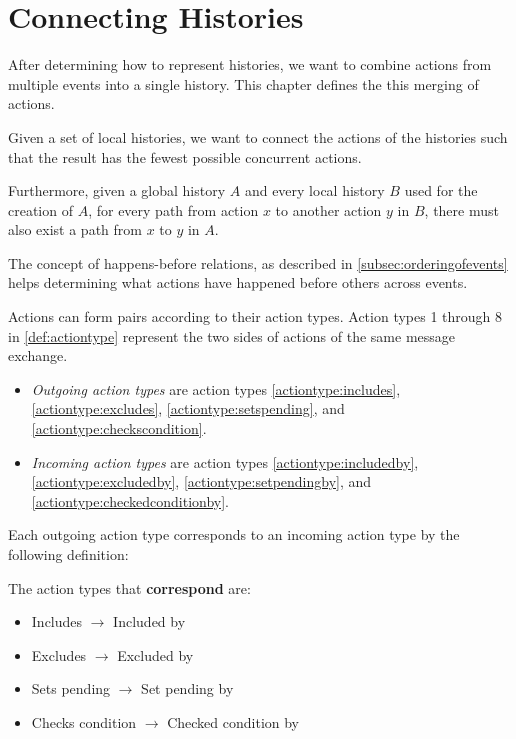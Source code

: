 \chapter{Connecting Histories} 
\label{chap:connecting-histories}
	After determining how to represent histories, we want to combine actions from multiple events into a single history. This chapter defines the this merging of actions.
	
    \newpar
    Given a set of local histories, we want to connect the actions of the histories such that the result has the fewest possible concurrent actions. 
    
    Furthermore, given a global history $A$ and every local history $B$ used for the creation of $A$, for every path from action $x$ to another action $y$ in $B$, there must also exist a path from $x$ to $y$ in $A$.
    
    
    \newpar
    The concept of happens-before relations, as described in \autoref{subsec:orderingofevents} helps determining what actions have happened before others across events.
	
    \newpar
	Actions can form pairs according to their action types. Action types 1 through 8 in \autoref{def:actiontype} represent the two sides of actions of the same message exchange.
	
	\begin{itemize}
		\item \textit{Outgoing action types} are action types \ref{actiontype:includes}, \ref{actiontype:excludes}, \ref{actiontype:setspending}, and \ref{actiontype:checkscondition}.
		\item \textit{Incoming action types} are action types \ref{actiontype:includedby}, \ref{actiontype:excludedby}, \ref{actiontype:setpendingby}, and \ref{actiontype:checkedconditionby}. 
	\end{itemize}
		
	\noindent Each outgoing action type corresponds to an incoming action type by the following definition:
	
	\begin{definition}
		\label{def:happensbeforeaction}
		The action types that \textbf{correspond} are:
			\begin{itemize}
				\item Includes $\rightarrow$ Included by
				\item Excludes $\rightarrow$ Excluded by
				\item Sets pending $\rightarrow$ Set pending by
				\item Checks condition $\rightarrow$ Checked condition by
			\end{itemize}
	\end{definition}
	
